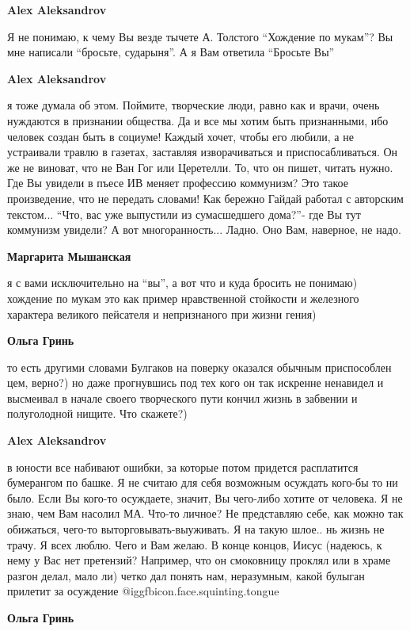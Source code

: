 \begin{itemize}
\begin{itemize}
\begin{itemize}
\textbf{Alex Aleksandrov} 

Я не понимаю, к чему Вы везде тычете А. Толстого \enquote{Хождение по мукам}? Вы мне
написали \enquote{бросьте, сударыня}. А я Вам ответила \enquote{Бросьте Вы}

\textbf{Alex Aleksandrov} 

я тоже думала об этом. Поймите, творческие люди, равно как и врачи, очень
нуждаются в признании общества. Да и все мы хотим быть признанными, ибо человек
создан быть в социуме! Каждый хочет, чтобы его любили, а не устраивали травлю в
газетах, заставляя изворачиваться и приспосабливаться. Он же не виноват, что не
Ван Гог или Церетелли. То, что он пишет, читать нужно. Где Вы увидели в пъесе
ИВ меняет профессию коммунизм? Это такое произведение, что не передать словами!
Как бережно Гайдай работал с авторским текстом... \enquote{Что, вас уже выпустили из
сумасшедшего дома?}- где Вы тут коммунизм увидели? А вот многоранность...
Ладно. Оно Вам, наверное, не надо.


\textbf{Маргарита Мышанская} 

я с вами исключительно на \enquote{вы}, а вот что и куда бросить не понимаю) хождение
по мукам это как пример нравственной стойкости и железного характера великого
пейсателя и непризнаного при жизни гения)


\textbf{Ольга Гринь} 

то есть другими словами Булгаков на поверку оказался обычным приспособлен цем,
верно?) но даже прогнувшись под тех кого он так искренне ненавидел и высмеивал
в начале своего творческого пути кончил жизнь в забвении и полуголодной нищите.
Что скажете?)

\textbf{Alex Aleksandrov} 

в юности все набивают ошибки, за которые потом придется расплатится бумерангом
по башке. Я не считаю для себя возможным осуждать кого-бы то ни было. Если Вы
кого-то осуждаете, значит, Вы чего-либо хотите от человека. Я не знаю, чем Вам
насолил МА. Что-то личное? Не представляю себе, как можно так обижаться,
чего-то выторговывать-выуживать. Я на такую шлое.. нь жизнь не трачу. Я всех
люблю. Чего и Вам желаю. В конце концов, Иисус (надеюсь, к нему у Вас нет
претензий? Например, что он смоковницу проклял или в храме разгон делал, мало
ли) четко дал понять нам, неразумным, какой булыган прилетит за осуждение @igg{fbicon.face.squinting.tongue} 

\textbf{Ольга Гринь} 


\end{itemize}
\end{itemize}
\end{itemize}
